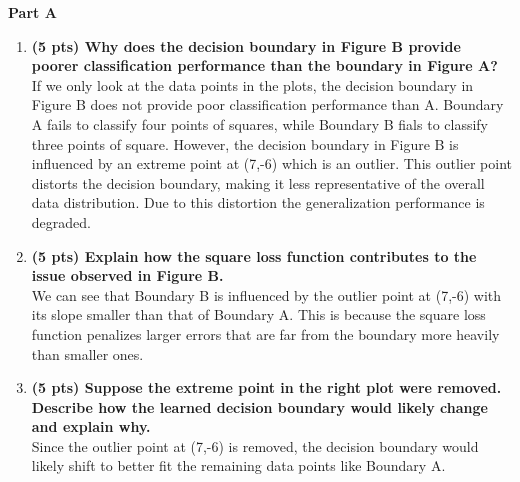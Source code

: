 \documentclass[12pt]{article}
\begin{document}
\textbf{Part A}
\begin{enumerate}[label=(\alph*)]
    \item \textbf{(5 pts) Why does the decision boundary in Figure B provide poorer classification performance than the boundary in Figure A?}
    \\
    If we only look at the data points in the plots, the decision boundary in Figure B does not provide poor classification performance than A.
    Boundary A fails to classify four points of squares, while Boundary B fials to classify three points of square.
    However, the decision boundary in Figure B is influenced by an extreme point at (7,-6) which is an outlier.
    This outlier point distorts the decision boundary, making it less representative of the overall data distribution.
    Due to this distortion the generalization performance is degraded.

    \item \textbf{(5 pts) Explain how the square loss function contributes to the issue observed in Figure B.}
    \\
    We can see that Boundary B is influenced by the outlier point at (7,-6) with its slope smaller than that of Boundary A.
    This is because the square loss function penalizes larger errors that are far from the boundary more heavily than smaller ones.

    
    \item \textbf{(5 pts) Suppose the extreme point in the right plot were removed. Describe how the learned decision boundary would likely change and explain why.}
    \\
    Since the outlier point at (7,-6) is removed, 
    the decision boundary would likely shift to better fit the remaining data points like Boundary A.
\end{enumerate}
\end{document}
